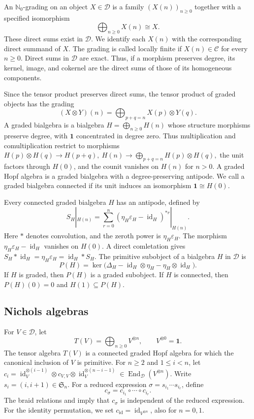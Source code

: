\documentclass[11pt, a4paper]{article}
\numberwithin{equation}{section}
\newcommand{\C}{\mathcal C}
\newcommand{\D}{\mathcal D}
\newcommand{\one}{\mathbf 1}
\DeclareMathOperator{\id}{id}
\begin{document}
An $\mathbb N_0$-grading on an object $X\in\D$ is a family
$(X(n))_{n\geq0}$ together with a specified isomorphism
\[
 \bigoplus_{n\geq0}X(n)\cong X.
\]
These direct sums exist in $\D$. We identify each $X(n)$
with the corresponding direct summand of $X$.
The grading is called locally finite if $X(n)\in\C$
for every $n\geq0$. 
Direct sums in $\D$ are exact. Thus, if a morphism preserves
degree, its kernel, image, and cokernel are the direct sums
of those of its homogeneous components.


Since the tensor product preserves direct sums, the tensor
product of graded objects has the grading
\[
 (X\otimes Y)(n)
 =\bigoplus_{p+q=n}X(p)\otimes Y(q).
\]
A graded bialgebra is a bialgebra
$H=\bigoplus_{n\geq0}H(n)$ whose structure morphisms preserve
degree, with $\one$ concentrated in degree zero.
Thus multiplication and comultiplication restrict to morphisms
$
 H(p)\otimes H(q)\longrightarrow H(p+q),
\
 H(n)\longrightarrow\bigoplus_{p+q=n}H(p)\otimes H(q),
$
the unit factors through $H(0)$, and the counit vanishes
on $H(n)$ for $n>0$.
A graded Hopf algebra is a graded bialgebra with a
degree-preserving antipode.
We call a graded bialgebra connected if its unit induces
an isomorphism $\one\cong H(0)$.


Every connected graded bialgebra $H$ has an antipode, defined by
\[
 S_H|_{H(n)}
 =\sum_{r=0}^{n}(\eta_H\varepsilon_H-\id_H)^{*r}|_{H(n)}.
\]
Here $*$ denotes convolution, and the zeroth power is
$\eta_H\varepsilon_H$.
The morphism $\eta_H\varepsilon_H-\id_H$ vanishes on $H(0)$.
 {A direct comletation gives}
$
 S_H*\id_H=\eta_H\varepsilon_H=\id_H*S_H.
$
The primitive subobject of a bialgebra $H$ in $\D$ is
\[
 P(H)=\ker\bigl(\Delta_H-\id_H\otimes\eta_H
                         -\eta_H\otimes\id_H\bigr).
\]
If $H$ is graded, then $P(H)$ is a graded subobject. If $H$ is
connected, then $P(H)(0)=0$ and $H(1)\subseteq P(H)$.


\subsection{Nichols algebras}\label{pre:nichols}

For $V\in\D$, let
\[
 T(V)=\bigoplus_{n\geq0}V^{\otimes n},\qquad V^{\otimes0}=\one.
\]
The tensor algebra $T(V)$ is a connected graded Hopf algebra for which
the canonical inclusion of $V$ is primitive. For $n\geq2$ and $1\leq i<n$, let
$
 c_i=\id_V^{\otimes(i-1)}\otimes c_{V,V}
             \otimes\id_V^{\otimes(n-i-1)}
 \in\operatorname{End}_{\D}(V^{\otimes n}).
$
Write $s_i=(i,i+1)\in\mathfrak S_n$. For a reduced expression
$\sigma=s_{i_1}\cdots s_{i_r}$, define
\[
 c_\sigma=c_{i_1}\circ\cdots\circ c_{i_r}.
\]
The braid relations and \cite[Theorem~1.7.4]{rootsys} imply that
$c_\sigma$ is independent of the reduced expression.
For the identity permutation, we set
$c_{\mathrm{id}}=\id_{V^{\otimes n}}$, also for $n=0,1$.
\end{document}
